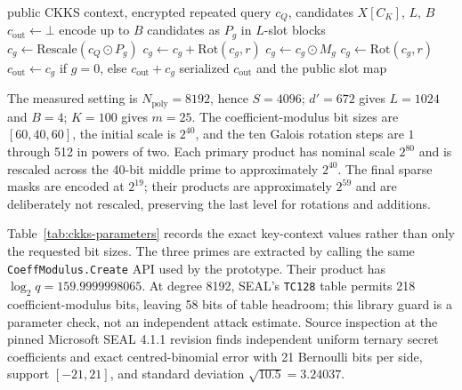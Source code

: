 \documentclass[pdflatex,sn-basic,Numbered]{sn-jnl}
\theoremstyle{plain}
\begin{document}
\begin{algorithm}[t]
\caption{Provider-side one-response block-packed reranking}\label{alg:kernel}
\begin{algorithmic}[1]
\Require public CKKS context, encrypted repeated query $c_Q$, candidates $X[C_K]$, $L$, $B$
\State $c_{\mathrm{out}}\gets\bot$
  \State encode up to $B$ candidates as $P_g$ in $L$-slot blocks
  \State $c_g\gets\mathrm{Rescale}(c_Q\odot P_g)$
    \State $c_g\gets c_g+\mathrm{Rot}(c_g,r)$
  \EndFor
  \State $c_g\gets c_g\odot M_g$ 
    \State $c_g\gets\mathrm{Rot}(c_g,r)$
  \EndFor
  \State $c_{\mathrm{out}}\gets c_g$ if $g=0$, else $c_{\mathrm{out}}+c_g$
\EndFor
\State \Return serialized $c_{\mathrm{out}}$ and the public slot map
\end{algorithmic}
\end{algorithm}

The measured setting is $N_{\mathrm{poly}}=8192$, hence $S=4096$; $d'=672$ gives $L=1024$ and $B=4$; $K=100$ gives $m=25$. The coefficient-modulus bit sizes are $[60,40,60]$, the initial scale is $2^{40}$, and the ten Galois rotation steps are $1$ through 512 in powers of two. Each primary product has nominal scale $2^{80}$ and is rescaled across the 40-bit middle prime to approximately $2^{40}$. The final sparse masks are encoded at $2^{19}$; their products are approximately $2^{59}$ and are deliberately not rescaled, preserving the last level for rotations and additions.

Table~\ref{tab:ckks-parameters} records the exact key-context values rather than only the requested bit sizes. The three primes are extracted by calling the same \texttt{CoeffModulus.Create} API used by the prototype. Their product has $\log_2 q=159.9999998065$. At degree 8192, SEAL's \texttt{TC128} table permits 218 coefficient-modulus bits, leaving 58 bits of table headroom; this library guard is a parameter check, not an independent attack estimate. Source inspection at the pinned Microsoft SEAL 4.1.1 revision finds independent uniform ternary secret coefficients and exact centred-binomial error with 21 Bernoulli bits per side, support $[-21,21]$, and standard deviation $\sqrt{10.5}=3.24037$.
\end{document}

